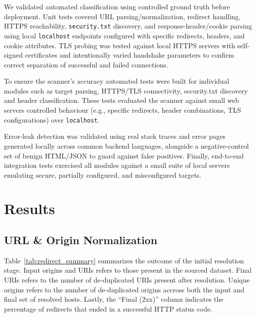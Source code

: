 \documentclass[conference]{IEEEtran}
\begin{document}
We validated automated classification using controlled ground truth before deployment.
Unit tests covered URL parsing/normalization, redirect handling, HTTPS reachability, \texttt{security.txt} 
discovery, and response-header/cookie parsing using local \texttt{localhost} endpoints configured with
specific redirects, headers, and cookie attributes. TLS probing was tested against local
HTTPS servers with self-signed certificates and intentionally varied handshake parameters to 
confirm correct separation of successful and failed connections.

To ensure the scanner's accuracy automated tests were built for individual modules such as target parsing, 
HTTPS/TLS connectivity, security.txt discovery and header classification. 
These tests evaluated the scanner against small web servers controlled behaviour (e.g., specific redirects, 
header combinations, TLS configurations)
over \texttt{localhost}. 

Error-leak detection was validated using real stack traces and error pages generated 
locally across common backend languages, alongside a negative-control set of 
benign HTML/JSON to guard against false positives. Finally, end-to-end integration tests exercised
all modules against a small suite of local servers emulating secure, partially configured, 
and misconfigured targets.


\section{Results}\label{sec:result}


\subsection{URL \& Origin Normalization}

Table~\ref{tab:redirect_summary} summarizes the outcome of the initial resolution stage. 
Input origins and URIs refers to those present in the sourced dataset. Final URIs
refers to the number of de-duplicated URIs present after resolution. Unique origins
refers to the number of de-duplicated origins accross both the input and final set of 
resolved hosts. Lastly, the ``Final (2xx)'' column indicates the percentage of redirects
that ended in a successful HTTP status code.
\end{document}
